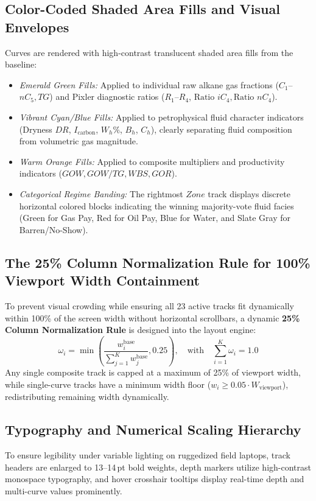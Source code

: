 \subsection{Color-Coded Shaded Area Fills and Visual Envelopes}
Curves are rendered with high-contrast translucent shaded area fills from the baseline:
\begin{itemize}
    \item \textit{Emerald Green Fills:} Applied to individual raw alkane gas fractions ($C_1$--$nC_5, TG$) and Pixler diagnostic ratios ($R_1$--$R_4$, $\text{Ratio } iC_4, \text{Ratio } nC_4$).
    \item \textit{Vibrant Cyan/Blue Fills:} Applied to petrophysical fluid character indicators (Dryness $DR$, $I_{\text{carbon}}$, $W_h\%$, $B_h$, $C_h$), clearly separating fluid composition from volumetric gas magnitude.
    \item \textit{Warm Orange Fills:} Applied to composite multipliers and productivity indicators ($GOW, GOW/TG, WBS, GOR$).
    \item \textit{Categorical Regime Banding:} The rightmost $Zone$ track displays discrete horizontal colored blocks indicating the winning majority-vote fluid facies (Green for Gas Pay, Red for Oil Pay, Blue for Water, and Slate Gray for Barren/No-Show).
\end{itemize}

\subsection{The 25\% Column Normalization Rule for 100\% Viewport Width Containment}
To prevent visual crowding while ensuring all 23 active tracks fit dynamically within 100\% of the screen width without horizontal scrollbars, a dynamic \textbf{25\% Column Normalization Rule} is designed into the layout engine:
\begin{equation}
    \omega_i = \min\left(\frac{w_i^{\text{base}}}{\sum_{j=1}^{K} w_j^{\text{base}}}, 0.25\right), \quad \text{with} \quad \sum_{i=1}^{K} \omega_i = 1.0
\end{equation}
Any single composite track is capped at a maximum of 25\% of viewport width, while single-curve tracks have a minimum width floor ($w_i \ge 0.05 \cdot W_{\text{viewport}}$), redistributing remaining width dynamically.

\subsection{Typography and Numerical Scaling Hierarchy}
To ensure legibility under variable lighting on ruggedized field laptops, track headers are enlarged to 13–14\,pt bold weights, depth markers utilize high-contrast monospace typography, and hover crosshair tooltips display real-time depth and multi-curve values prominently.

